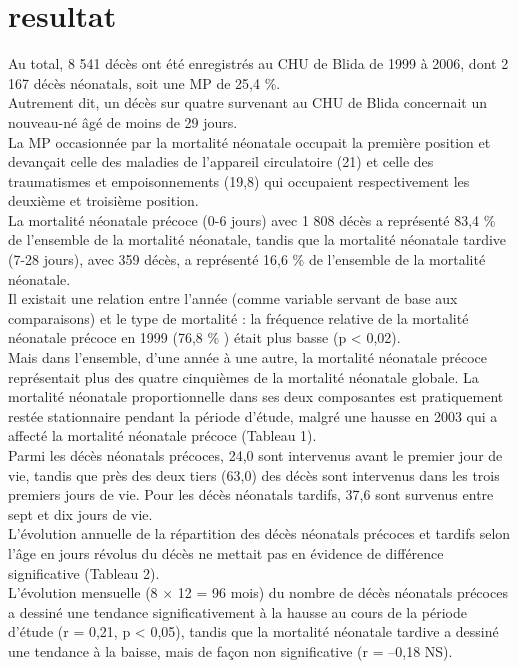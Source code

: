 \section{resultat}
Au total, 8 541 décès ont été enregistrés au CHU de Blida
de 1999 à 2006, dont 2 167 décès néonatals, soit une MP de
25,4 \%.\\
Autrement dit, un décès sur quatre survenant au
CHU de Blida concernait un nouveau-né âgé de moins
de 29 jours. \\ 
La MP occasionnée par la mortalité néonatale
occupait la première position et devançait celle des maladies
de l’appareil circulatoire (21) et celle des traumatismes et
empoisonnements (19,8) qui occupaient respectivement
les deuxième et troisième position. \\

La mortalité néonatale précoce (0-6 jours) avec 1 808
décès a représenté 83,4 \% de l’ensemble de la mortalité
néonatale, tandis que la mortalité néonatale tardive
(7-28 jours), avec 359 décès, a représenté 16,6 \%  de
l’ensemble de la mortalité néonatale.\\ 

Il existait une relation
entre l’année (comme variable servant de base aux
comparaisons) et le type de mortalité : la fréquence relative
de la mortalité néonatale précoce en 1999 (76,8 \% ) était plus
basse (p < 0,02). \\ 

Mais dans l’ensemble, d’une année à une
autre, la mortalité néonatale précoce représentait plus des
quatre cinquièmes de la mortalité néonatale globale.
La mortalité néonatale proportionnelle dans ses deux
composantes est pratiquement restée stationnaire pendant la
période d’étude, malgré une hausse en 2003 qui a affecté la
mortalité néonatale précoce (Tableau 1).\\

Parmi les décès néonatals précoces, 24,0  sont intervenus
avant le premier jour de vie, tandis que près des deux
tiers (63,0) des décès sont intervenus dans les trois
premiers jours de vie. Pour les décès néonatals tardifs,
37,6 sont survenus entre sept et dix jours de vie.\\

L’évolution annuelle de la répartition des décès néonatals
précoces et tardifs selon l’âge en jours révolus du décès
ne mettait pas en évidence de différence significative
(Tableau 2).\\

L’évolution mensuelle (8 × 12 = 96 mois) du nombre de
décès néonatals précoces a dessiné une tendance significativement
à la hausse au cours de la période d’étude (r = 0,21,
p < 0,05), tandis que la mortalité néonatale tardive a dessiné
une tendance à la baisse, mais de façon non significative
(r = –0,18 NS). \\ 

